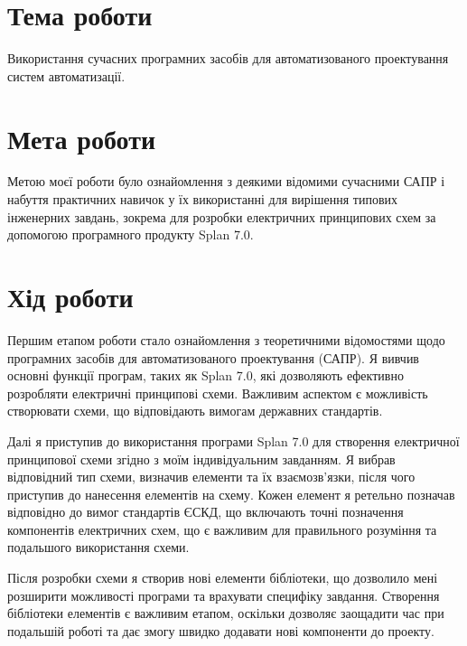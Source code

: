 \documentclass[a4paper]{article}
\begin{document}

    \section*{Тема роботи}
    Використання сучасних програмних засобів для автоматизованого проектування систем автоматизації.

    \section*{Мета роботи}
    Метою моєї роботи було ознайомлення з деякими відомими сучасними САПР і набуття практичних навичок 
    у їх використанні для вирішення типових інженерних завдань, зокрема для розробки електричних 
    принципових схем за допомогою програмного продукту Splan 7.0.

    \section*{Хід роботи}
    Першим етапом роботи стало ознайомлення з теоретичними відомостями щодо програмних засобів для 
    автоматизованого проектування (САПР). Я вивчив основні функції програм, таких як Splan 7.0, які 
    дозволяють ефективно розробляти електричні принципові схеми. Важливим аспектом є можливість 
    створювати схеми, що відповідають вимогам державних стандартів.

    Далі я приступив до використання програми Splan 7.0 для створення електричної принципової схеми 
    згідно з моїм індивідуальним завданням. Я вибрав відповідний тип схеми, визначив елементи та їх 
    взаємозв'язки, після чого приступив до нанесення елементів на схему. Кожен елемент я ретельно 
    позначав відповідно до вимог стандартів ЄСКД, що включають точні позначення компонентів електричних 
    схем, що є важливим для правильного розуміння та подальшого використання схеми.

    Після розробки схеми я створив нові елементи бібліотеки, що дозволило мені розширити можливості 
    програми та врахувати специфіку завдання. Створення бібліотеки елементів є важливим етапом, 
    оскільки дозволяє заощадити час при подальшій роботі та дає змогу швидко додавати нові компоненти 
    до проекту.
\end{document}
